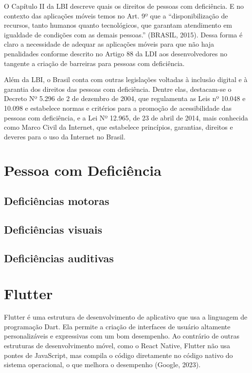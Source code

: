 O Capítulo II da LBI descreve quais os direitos de pessoas com deficiência. E no contexto das aplicações móveis temos no Art. 9º que a “disponibilização de recursos, tanto humanos quanto tecnológicos, que garantam atendimento em igualdade de condições com as demais pessoas.” (BRASIL, 2015). Dessa forma é claro a necessidade de adequar as aplicações móveis para que não haja penalidades conforme descrito no Artigo 88 da LDI aos desenvolvedores no tangente a criação de barreiras para pessoas com deficiência.

Além da LBI, o Brasil conta com outras legislações voltadas à inclusão digital e à garantia dos direitos das pessoas com deficiência. Dentre elas, destacam-se o Decreto Nº 5.296 de 2 de dezembro de 2004, que regulamenta as Leis nº 10.048 e 10.098 e estabelece normas e critérios para a promoção de acessibilidade das pessoas com deficiência, e a Lei Nº 12.965, de 23 de abril de 2014, mais conhecida como Marco Civil da Internet, que estabelece princípios, garantias, direitos e deveres para o uso da Internet no Brasil.

\section{Pessoa com Deficiência}

\subsection{Deficiências motoras}

\subsection{Deficiências visuais}

\subsection{Deficiências auditivas}

\section{Flutter}

Flutter é uma estrutura de desenvolvimento de aplicativo que usa a linguagem de programação Dart. Ela permite a criação de interfaces de usuário altamente personalizáveis e expressivas com um bom desempenho. Ao contrário de outras estruturas de desenvolvimento móvel, como o React Native, Flutter não usa pontes de JavaScript, mas compila o código diretamente no código nativo do sistema operacional, o que melhora o desempenho (Google, 2023).

